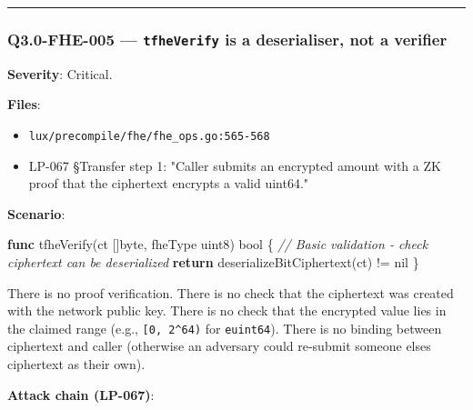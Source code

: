 \documentclass[
]{article}
\newenvironment{Shaded}{}{}
\newcommand{\CommentTok}[1]{\textcolor[rgb]{0.38,0.63,0.69}{\textit{#1}}}
\newcommand{\ControlFlowTok}[1]{\textcolor[rgb]{0.00,0.44,0.13}{\textbf{#1}}}
\newcommand{\DataTypeTok}[1]{\textcolor[rgb]{0.56,0.13,0.00}{#1}}
\newcommand{\KeywordTok}[1]{\textcolor[rgb]{0.00,0.44,0.13}{\textbf{#1}}}
\newcommand{\NormalTok}[1]{#1}
\newcommand{\OperatorTok}[1]{\textcolor[rgb]{0.40,0.40,0.40}{#1}}
\newcommand{\OtherTok}[1]{\textcolor[rgb]{0.00,0.44,0.13}{#1}}
\providecommand{\tightlist}{%
  \setlength{\itemsep}{0pt}\setlength{\parskip}{0pt}}
\begin{document}
\begin{center}\rule{0.5\linewidth}{0.5pt}\end{center}

\subsubsection{\texorpdfstring{Q3.0-FHE-005 --- \texttt{tfheVerify} is a
deserialiser, not a
verifier}{Q3.0-FHE-005 --- tfheVerify is a deserialiser, not a verifier}}\label{q30-fhe-005--tfheverify-is-a-deserialiser-not-a-verifier}

\textbf{Severity}: Critical.

\textbf{Files}:

\begin{itemize}
\tightlist
\item
  \texttt{lux/precompile/fhe/fhe\_ops.go:565-568}
\item
  LP-067 §Transfer step 1: "Caller submits an encrypted amount with a ZK
  proof that the ciphertext encrypts a valid uint64."
\end{itemize}

\textbf{Scenario}:

\begin{Shaded}
\begin{Highlighting}[]
\KeywordTok{func}\NormalTok{ tfheVerify}\OperatorTok{(}\NormalTok{ct }\OperatorTok{[]}\DataTypeTok{byte}\OperatorTok{,}\NormalTok{ fheType }\DataTypeTok{uint8}\OperatorTok{)} \DataTypeTok{bool} \OperatorTok{\{}
    \CommentTok{// Basic validation {-} check ciphertext can be deserialized}
    \ControlFlowTok{return}\NormalTok{ deserializeBitCiphertext}\OperatorTok{(}\NormalTok{ct}\OperatorTok{)} \OperatorTok{!=} \OtherTok{nil}
\OperatorTok{\}}
\end{Highlighting}
\end{Shaded}

There is no proof verification. There is no check that the ciphertext
was created with the network public key. There is no check that the
encrypted value lies in the claimed range (e.g.,
\texttt{{[}0,\ 2\^{}64)} for \texttt{euint64}). There is no binding
between ciphertext and caller (otherwise an adversary could re-submit
someone else\textquotesingle s ciphertext as their own).

\textbf{Attack chain (LP-067)}:
\end{document}

